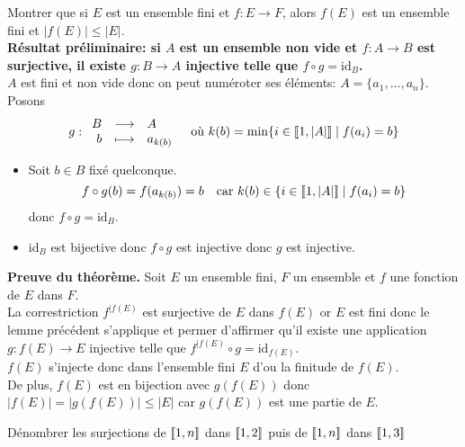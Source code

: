 \documentclass{article}
\renewenvironment{question_kholle}[2][ ]
{
	\subsection{\texorpdfstring{#2}{}}
	\notblank{#1}
	{
		\noindent #1
		\bigbreak
	}
	{}
	\begin{proof}
}
{
	\end{proof}
}
\begin{document}
\begin{question_kholle}{Montrer que si $E$ est un ensemble fini et $f:E\longrightarrow F$, alors $f(E)$ est un ensemble fini et $|f(E)|\leq |E|$.}
	\hfill\\
	\textbf{Résultat préliminaire: si $A$ est un ensemble non vide et $f:A\longrightarrow B$ est surjective, il existe $g:B\longrightarrow A$ injective telle que $f\circ g=\mathrm{id}_{B}$.}\\
	$A$ est fini et non vide donc on peut numéroter ses éléments: $A=\{a_{1},\dots,a_{n}\}$. Posons
	\[
		g:\begin{array}{rcl} B & \longrightarrow & A \\ b & \longmapsto & a_{k(b)} \end{array} \quad\text{où $k(b)=\min\{i\in[\![ 1,|A| ]\!] \mid f(a_{i})=b\}$}
	\]
	\begin{itemize}
		\item Soit $b\in B$ fixé quelconque.
		      \[
			      f\circ g(b)=f(a_{k(b)}) = b \quad\text{car } k(b)\in\{i\in[\![ 1,|A| ]\!]\mid f(a_{i})=b\}
		      \]
		      donc $f\circ g=\mathrm{id}_{B}$.
		\item $\mathrm{id}_{B}$ est bijective donc $f\circ g$ est injective donc $g$ est injective.
	\end{itemize}

	\vspace{2em}

	\noindent\textbf{Preuve du théorème.}
	Soit $E$ un ensemble fini, $F$ un ensemble et $f$ une fonction de $E$ dans $F$.\\
	La correstriction $f^{|f(E)}$ est surjective de $E$ dans $f(E)$ or $E$ est fini donc le lemme précédent s’applique et permer d’affirmer qu’il existe une application $g:f(E)\longrightarrow E$ injective telle que $f^{|f(E)}\circ g = \mathrm{id}_{f(E)}$.\\
	$f(E)$ s’injecte donc dans l’ensemble fini $E$ d’ou la finitude de $f(E)$.\\
	De plus, $f(E)$ est en bijection avec $g(f(E))$ donc $|f(E)|=|g(f(E))|\leq |E|$ car $g(f(E))$ est une partie de $E$.

\end{question_kholle}

\begin{question_kholle}{Dénombrer les surjections de $[\![ 1,n ]\!]$ dans $[\![ 1,2 ]\!]$ puis de $[\![ 1,n ]\!]$ dans $[\![ 1,3 ]\!]$}

\end{question_kholle}
\end{document}
